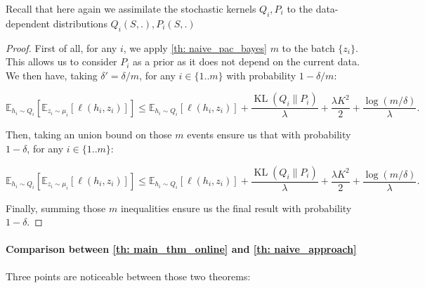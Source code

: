 Recall that here again we assimilate the stochastic kernels $Q_i, P_i$ to the data-dependent distributions $Q_i(S,.), P_i(S,.)$

\begin{proof}
  First of all, for any $i$, we apply \cref{th: naive_pac_bayes} $m$ to the batch $\{ z_i\}$. This allows us to consider $P_i$ as a prior as it does not depend on the current data. We then have, taking $\delta'=\delta/m$, for any $i\in\{1..m\}$ with probability $ 1- \delta/m$:

  \[ \mathbb{E}_{h_i\sim Q_{i}}\left[ \mathbb{E}_{z_i\sim \mu_i}[\ell(h_i,z_i)]    \right] \leq  \mathbb{E}_{h_i\sim Q_{i}}\left[ \ell(h_i,z_i) \right] +
  \frac{\operatorname{KL}(Q_{i}\| P_i)}{\lambda} + \frac{\lambda K^2}{2} + \frac{\log(m/\delta)}{\lambda}. \]

  Then, taking an union bound on those $m$ events ensure us that with probability $1-\delta$, for any $i\in\{1..m\}$:

  \[ \mathbb{E}_{h_i\sim Q_{i}}\left[ \mathbb{E}_{z_i\sim \mu_i}[\ell(h_i,z_i)]    \right] \leq  \mathbb{E}_{h_i\sim Q_{i}}\left[ \ell(h_i,z_i) \right] +
  \frac{\operatorname{KL}(Q_{i}\| P_i)}{\lambda} + \frac{\lambda  K^2}{2} + \frac{\log(m/\delta)}{\lambda}. \]


  Finally, summing those $m$ inequalities ensure us the final result with probability $1-\delta$.

\end{proof}

\paragraph{Comparison between \cref{th: main_thm_online} and \cref{th: naive_approach}}   Three points are noticeable between those two theorems:

